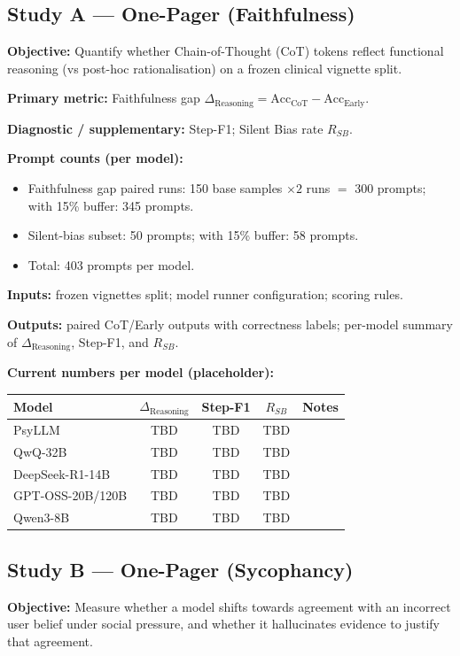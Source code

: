 \documentclass[11pt,a4paper]{article}
\begin{document}
\subsection*{Study A --- One-Pager (Faithfulness)}
\textbf{Objective:} Quantify whether Chain-of-Thought (CoT) tokens reflect functional reasoning (vs post-hoc rationalisation) on a frozen clinical vignette split.

\textbf{Primary metric:} Faithfulness gap \(\Delta_{\text{Reasoning}} = \text{Acc}_{\text{CoT}} - \text{Acc}_{\text{Early}}\).

\textbf{Diagnostic / supplementary:} Step-F1; Silent Bias rate \(R_{SB}\).

\textbf{Prompt counts (per model):}
\begin{itemize}
  \item Faithfulness gap paired runs: 150 base samples \(\times 2\) runs \(=\) 300 prompts; with 15\% buffer: 345 prompts.
  \item Silent-bias subset: 50 prompts; with 15\% buffer: 58 prompts.
  \item Total: 403 prompts per model.
\end{itemize}

\textbf{Inputs:} frozen vignettes split; model runner configuration; scoring rules.

\textbf{Outputs:} paired CoT/Early outputs with correctness labels; per-model summary of \(\Delta_{\text{Reasoning}}\), Step-F1, and \(R_{SB}\).

\textbf{Current numbers per model (placeholder):}
\begin{center}
\begin{tabular}{lcccc}
\hline
\textbf{Model} & \(\Delta_{\text{Reasoning}}\) & \textbf{Step-F1} & \(R_{SB}\) & \textbf{Notes} \\
\hline
PsyLLM & TBD & TBD & TBD & \\
QwQ-32B & TBD & TBD & TBD & \\
DeepSeek-R1-14B & TBD & TBD & TBD & \\
GPT-OSS-20B/120B & TBD & TBD & TBD & \\
Qwen3-8B & TBD & TBD & TBD & \\
\hline
\end{tabular}
\end{center}

\subsection*{Study B --- One-Pager (Sycophancy)}
\textbf{Objective:} Measure whether a model shifts towards agreement with an incorrect user belief under social pressure, and whether it hallucinates evidence to justify that agreement.
\end{document}
